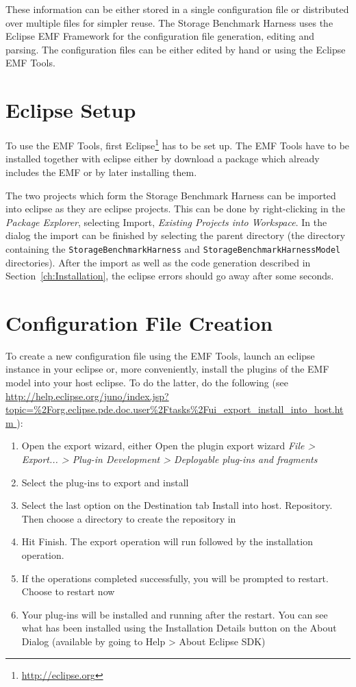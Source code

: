 These information can be either stored in a single configuration file or
distributed over multiple files for simpler reuse. The Storage Benchmark Harness
uses the Eclipse EMF Framework for the configuration file generation, editing
and parsing. The configuration files can be either edited by hand or using the
Eclipse EMF Tools.

\section{Eclipse Setup}
To use the EMF Tools, first Eclipse\footnote{\url{http://eclipse.org}} has to be
set up. The EMF Tools have to be installed together with eclipse either by
download a package which already includes the EMF or by later installing them.

The two projects which form the Storage Benchmark Harness can be imported into
eclipse as they are eclipse projects. This can be done by right-clicking in the
\textit{Package Explorer}, selecting {Import}, \textit{Existing Projects into
Workspace}. In the dialog the import can be finished by selecting the parent
directory (the directory containing the \texttt{StorageBenchmarkHarness} and
\texttt{StorageBenchmarkHarnessModel} directories). After the import as well as the 
code generation described in Section~\ref{ch:Installation}, the eclipse errors should 
go away after some seconds.

\section{Configuration File Creation}
\label{sec:configurationfilecreation}
To create a new configuration file using the EMF Tools, launch an eclipse instance in your eclipse or, more conveniently, install the plugins of the EMF model into your host eclipse. To do the latter, do the following (see \url{http://help.eclipse.org/juno/index.jsp?topic=%
}):
\begin{enumerate}
  \item Open the export wizard, either Open the plugin export wizard \emph{File > Export... > Plug-in Development > Deployable plug-ins and fragments}
  \item Select the plug-ins to export and install
  \item Select the last option on the Destination tab Install into host. Repository. Then choose a directory to create the repository in
  \item Hit Finish. The export operation will run followed by the installation operation.
  \item If the operations completed successfully, you will be prompted to restart. Choose to restart now
  \item Your plug-ins will be installed and running after the restart. You can see what has been installed using the Installation Details button on the About Dialog (available by going to Help > About Eclipse SDK)
\end{enumerate}

